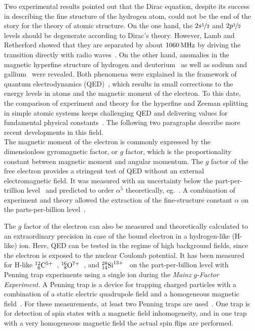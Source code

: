 Two experimental results pointed out that the Dirac equation, despite its success in describing the fine structure of the hydrogen atom, could not be the end of the story for the theory of atomic structure. On the one hand, the $2s\nicefrac{1}{2}$ and $2p\nicefrac{1}{2}$ levels should be degenerate according to Dirac's theory. However, Lamb and Retherford showed that they are separated by about $1060\,\rm{MHz}$ by driving the transition directly with radio waves~\cite{lamb1947}. On the other hand, anomalies in the magnetic hyperfine structure of hydrogen and deuterium~\cite{nafe1947} as well as sodium and gallium~\cite{kusch1947,kusch1948} were revealed. Both phenomena were explained in the framework of quantum electrodynamics (QED)~\cite{schwinger1948}, which results in small corrections to the energy levels in atoms and the magnetic moment of the electron. To this date, the comparison of experiment and theory for the hyperfine and Zeeman splitting in simple atomic systems keeps challenging QED and delivering values for fundamental physical constants~\cite{haensch1979}. The following two paragraphs describe more recent developments in this field.\\[11pt]
The magnetic moment of the electron is commonly expressed by the dimensionless gyromagnetic factor, or $g$ factor, which is the proportionality constant between magnetic moment and angular momentum. The $g$ factor of the free electron provides a stringent test of QED without an external electromagnetic field. It was measured with an uncertainty below the part-per-trillion level~\cite{odom2006,hanneke2008} and predicted to order $\alpha^5$ theoretically, eg.~\cite{kinoshita2006,aoyama2007,aoyama2015,aoyama2017}. A combination of experiment and theory allowed the extraction of the fine-structure constant $\alpha$ on the parts-per-billion level~\cite{gabrielse2006,gabrielse2007}.

The $g$ factor of the electron can also be measured and theoretically calculated to an extraordinary precision in case of the bound electron in a hydrogen-like (H-like) ion. Here, QED can be tested in the regime of high background fields, since the electron is exposed to the nuclear Coulomb potential. It has been measured for H-like $^{12}_{\phantom{0}6}\rm{C}^{5+}$~\cite{Haffner2000,Sturm2014}, $^{16}_{\phantom{0}8}\rm{O}^{7+}$~\cite{Verdu2004}, and $^{28}_{14}\rm{Si}^{13+}$~\cite{Sturm2011} on the part-per-billion level with Penning trap experiments using a single ion during the \textit{Mainz $g$-Factor Experiment}. A Penning trap is a device for trapping charged particles with a combination of a static electric quadrupole field and a homogeneous magnetic field~\cite{geoniumtheory}. For these measurements, at least two Penning traps are used~\cite{annphysgfactor}. One trap is for detection of spin states with a magnetic field inhomogeneity, and in one trap with a very homogeneous magnetic field the actual spin flips are performed.

